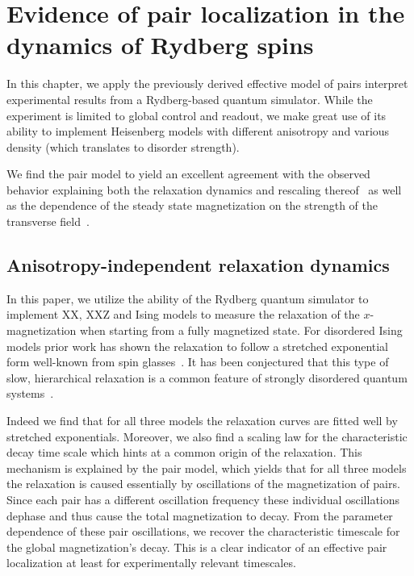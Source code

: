 \chapter{Evidence of pair localization in the dynamics of Rydberg spins}\label{ch:experimental-pairs}

In this chapter, we apply the previously derived effective model of pairs interpret experimental results from a Rydberg-based quantum simulator. While the experiment is limited to global control and readout, we make great use of its ability to implement Heisenberg models with different anisotropy and various density (which translates to disorder strength).

We find the pair model to yield  an excellent agreement with the observed behavior explaining both the relaxation dynamics and rescaling thereof~\cite{franzObservationAnisotropyindependentMagnetization2024} as well as the dependence of the steady state magnetization on the strength of the transverse field~\cite{franzEmergentPairLocalization2024}.


\section{Anisotropy-independent relaxation dynamics}\label{sec:universal-dynamics}
In this paper, we utilize the ability of the Rydberg quantum simulator to implement XX, XXZ and Ising models to measure the relaxation of the $x$-magnetization when starting from a fully magnetized state. For disordered Ising models prior work has shown the relaxation to follow a stretched exponential form well-known from spin glasses~\cite{breyStretchedExponentialDecay1993,signolesGlassyDynamicsDisordered2021,schultzenGlassyQuantumDynamics2022,schultzenSemiclassicalSimulationsPredict2022}. It has been conjectured that this type of slow, hierarchical relaxation is a common feature of strongly disordered quantum systems~\cite{haldarSlowDynamicsKohlrausch2023}.

Indeed we find that for all three models the relaxation curves are fitted well by stretched exponentials. Moreover, we also find a scaling law for the characteristic decay time scale which hints at a common origin of the relaxation. This mechanism is explained by the pair model, which yields that for all three models the relaxation is caused essentially by oscillations of the magnetization of pairs. Since each pair has a different oscillation frequency these individual oscillations dephase and thus cause the total magnetization to decay. From the parameter dependence of these pair oscillations, we recover the characteristic timescale for the global magnetization's decay. This is a clear indicator of an effective pair localization at least for experimentally relevant timescales.

